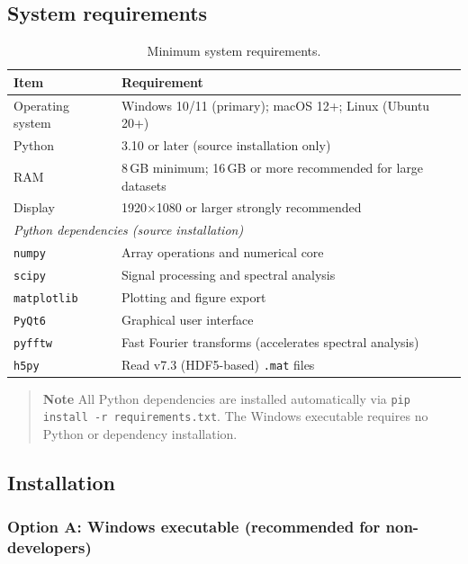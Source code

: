 \subsection{System requirements}

\begin{table}[htbp]
\centering
\caption{Minimum system requirements.}
\begin{tabular}{ll}
\toprule
\textbf{Item} & \textbf{Requirement} \\
\midrule
Operating system  & Windows 10/11 (primary); macOS 12+; Linux (Ubuntu 20+) \\
Python            & 3.10 or later (source installation only) \\
RAM               & 8\,GB minimum; 16\,GB or more recommended for large datasets \\
Display           & 1920$\times$1080 or larger strongly recommended \\
\midrule
\multicolumn{2}{l}{\textit{Python dependencies (source installation)}} \\
\midrule
\texttt{numpy}      & Array operations and numerical core \\
\texttt{scipy}      & Signal processing and spectral analysis \\
\texttt{matplotlib} & Plotting and figure export \\
\texttt{PyQt6}      & Graphical user interface \\
\texttt{pyfftw}     & Fast Fourier transforms (accelerates spectral analysis) \\
\texttt{h5py}       & Read v7.3 (HDF5-based) \texttt{.mat} files \\
\bottomrule
\end{tabular}
\end{table}

\begin{quote}
\textbf{Note}
All Python dependencies are installed automatically via \texttt{pip install -r requirements.txt}. The Windows executable requires no Python or dependency installation.
\end{quote}

\subsection{Installation}

\subsubsection{Option A: Windows executable (recommended for non-developers)}

